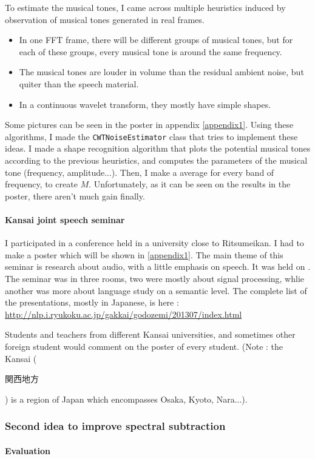 To estimate the musical tones, I came across multiple heuristics induced by observation of musical tones generated in real frames.

\begin{itemize}
\item In one FFT frame, there will be different groups of musical tones, but for each of these groups, every musical tone is around the same frequency.
\item The musical tones are louder in volume than the residual ambient noise, but quiter than the speech material.
\item In a continuous wavelet transform, they mostly have simple shapes.
\end{itemize}
Some pictures can be seen in the poster in appendix \ref{appendix1}.
Using these algorithms, I made the \texttt{CWTNoiseEstimator} class that tries to implement these ideas. I made a shape recognition algorithm that plots the potential musical tones according to the previous heuristics, and computes the parameters of the musical tone (frequency, amplitude...). Then, I make a average for every band of frequency, to create $M$. Unfortunately, as it can be seen on the results in the poster, there aren't much gain finally.
\paragraph{Kansai joint speech seminar}
I participated in a conference held in a university close to Ritsumeikan. I had to make a poster which will be shown in \ref{appendix1}.
The main theme of this seminar is research about audio, with a little emphasis on speech. It was held on . The seminar was in three rooms, two were mostly about signal processing, whlie another was more about language study on a semantic level. The complete list of the presentations, mostly in Japanese, is here : \url{http://nlp.i.ryukoku.ac.jp/gakkai/godozemi/201307/index.html}

Students and teachers from different Kansai universities, and sometimes other foreign student would comment on the poster of every student.
(Note : the Kansai (\begin{CJK}{UTF8}{min}関西地方\end{CJK}) is a region of Japan which encompasses Osaka, Kyoto, Nara...).

\subsubsection{Second idea to improve spectral subtraction}
\paragraph{Evaluation}